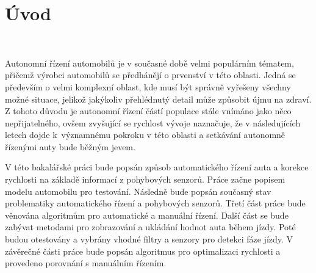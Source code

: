 \chapter*{Úvod}
\label{sec:Introduction}
\

Autonomní řízení automobilů je v současné době velmi populárním tématem, přičemž
výrobci automobilů se předhánějí o prvenství v této oblasti. Jedná se především o
velmi komplexní oblast, kde musí být správně vyřešeny všechny možné situace, jelikož
jakýkoliv přehlédnutý detail může způsobit újmu na zdraví. Z tohoto důvodu je
autonomní řízení částí populace stále vnímáno jako něco  nepřijatelného, ovšem
zvyšující se rychlost vývoje naznačuje, že v následujících letech dojde k~významnému
pokroku v této oblasti a setkávání autonomně řízenými auty bude běžným jevem.

V této bakalářské práci bude popsán způsob automatického řízení auta a korekce rychlosti na základě informací z pohybových senzorů. Práce začne popisem modelu automobilu pro testování. Následně bude popsán současný stav problematiky automatického řízení a pohybových senzorů. Třetí část práce bude věnována algoritmům pro automatické a manuální řízení. Další část se bude zabývat metodami pro zobrazování a ukládání hodnot auta během jízdy. Poté budou otestovány a vybrány vhodné filtry a senzory pro detekci fáze jízdy. V závěrečné části práce bude popsán algoritmus pro optimalizaci rychlosti a provedeno porovnání s manuálním řízením.

\endinput
